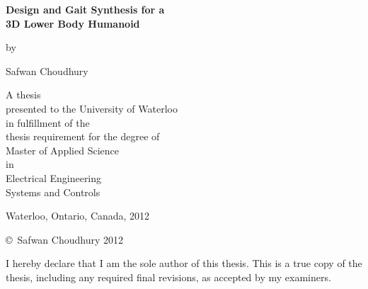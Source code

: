 \pagestyle{empty}


\begin{titlepage}
    \begin{center}
        \vspace*{1.0cm}

        \Huge
        {\bf Design and Gait Synthesis for a \\ 3D Lower Body Humanoid}

        \vspace*{1.0cm}

        \normalsize
        by \\

        \vspace*{1.0cm}

        \Large
        Safwan Choudhury \\

        \vspace*{3.0cm}

        \normalsize
        A thesis \\
        presented to the University of Waterloo \\ 
        in fulfillment of the \\
        thesis requirement for the degree of \\
        Master of Applied Science \\
        in \\
        Electrical Engineering\\
 		Systems and Controls \\

        \vspace*{2.0cm}

        Waterloo, Ontario, Canada, 2012 \\

        \vspace*{1.0cm}

        \copyright\ Safwan Choudhury 2012 \\
    \end{center}
\end{titlepage}

\pagestyle{plain}
\setcounter{page}{2}

\cleardoublepage


\noindent
I hereby declare that I am the sole author of this thesis. This is a true copy of the thesis, including any required final revisions, as accepted by my examiners.

